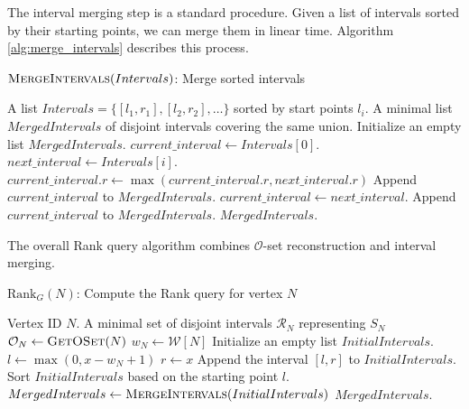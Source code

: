 The interval merging step is a standard procedure. Given a list of intervals sorted by their starting points, we can merge them in linear time. Algorithm \ref{alg:merge_intervals} describes this process.
\begin{algorithm}[htbp]
    \caption{$\textsc{MergeIntervals}(Intervals)$: Merge sorted intervals}
    \label{alg:merge_intervals}
    \small
    \begin{algorithmic}[1]
        \Require A list $Intervals = \{[l_1, r_1], [l_2, r_2], \dots\}$ sorted by start points $l_i$.
        \Ensure A minimal list $MergedIntervals$ of disjoint intervals covering the same union.
        \State Initialize an empty list $MergedIntervals$.
        \State $current\_interval \gets Intervals[0]$.
        \State $next\_interval \gets Intervals[i]$.
        \State $current\_interval.r \gets \max(current\_interval.r, next\_interval.r)$
        \Else
        \State Append $current\_interval$ to $MergedIntervals$.
        \State $current\_interval \gets next\_interval$.
        \EndIf
        \EndFor
        \State Append $current\_interval$ to $MergedIntervals$.
        \EndIf
        \State \Return $MergedIntervals$.
    \end{algorithmic}
\end{algorithm}

The overall Rank query algorithm combines $\mathcal{O}$-set reconstruction and interval merging.

\begin{algorithm}
    \caption{$\mathrm{Rank}_G(N)$: Compute the Rank query for vertex $N$}
    \label{alg:rank_dag}
    \small
    \begin{algorithmic}[1]
        \Require Vertex ID $N$.
        \Ensure A minimal set of disjoint intervals $\mathcal{R}_N$ representing $S_N$
        \State $\mathcal{O}_N \gets \textsc{GetOSet}(N)$
        \State $w_N \gets \mathcal{W}[N]$
        \State Initialize an empty list $InitialIntervals$.
        \State $l \gets \max(0, x - w_N + 1)$
        \State $r \gets x$
        \State Append the interval $[l, r]$ to $InitialIntervals$.
        \EndFor
        \State Sort $InitialIntervals$ based on the starting point $l$.
        \State $MergedIntervals \gets \textsc{MergeIntervals}(InitialIntervals)$
        \State \Return $MergedIntervals$.
    \end{algorithmic}
\end{algorithm}

